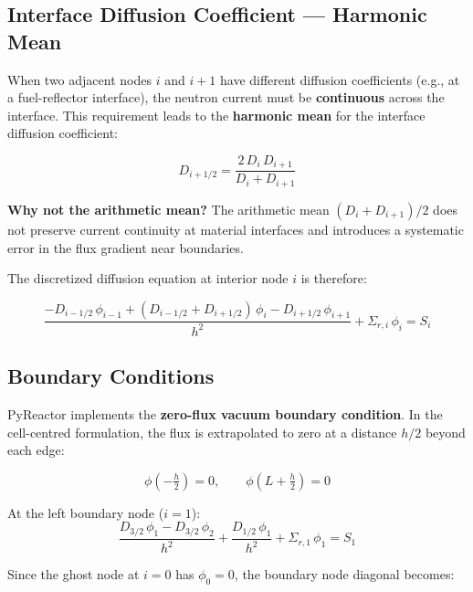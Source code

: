 \documentclass[12pt,a4paper]{article}
\begin{document}
\subsection{Interface Diffusion Coefficient — Harmonic Mean}

When two adjacent nodes $i$ and $i+1$ have different diffusion
coefficients (e.g., at a fuel-reflector interface), the neutron current
must be \textbf{continuous} across the interface. This requirement leads to
the \textbf{harmonic mean} for the interface diffusion coefficient:

\begin{eqbox}
\begin{equation}
  D_{i+1/2} = \frac{2\,D_i\,D_{i+1}}{D_i + D_{i+1}}
  \label{eq:harmonic}
\end{equation}
\end{eqbox}

\textbf{Why not the arithmetic mean?} The arithmetic mean
$(D_i + D_{i+1})/2$ does not preserve current continuity at
material interfaces and introduces a systematic error in the flux
gradient near boundaries.

The discretized diffusion equation at interior node $i$ is therefore:

\begin{equation}
  \frac{-D_{i-1/2}\,\phi_{i-1} + (D_{i-1/2} + D_{i+1/2})\,\phi_i
        - D_{i+1/2}\,\phi_{i+1}}{h^2}
  + \Sigma_{r,i}\,\phi_i = S_i
  \label{eq:fd_interior}
\end{equation}

\subsection{Boundary Conditions}

PyReactor implements the \textbf{zero-flux vacuum boundary condition}.
In the cell-centred formulation, the flux is extrapolated to zero
at a distance $h/2$ beyond each edge:

\begin{equation}
  \phi\!\left(-\tfrac{h}{2}\right) = 0, \qquad
  \phi\!\left(L + \tfrac{h}{2}\right) = 0
  \label{eq:bc}
\end{equation}

At the left boundary node ($i = 1$):
\begin{equation}
  \frac{D_{3/2}\,\phi_1 - D_{3/2}\,\phi_2}{h^2}
  + \frac{D_{1/2}\,\phi_1}{h^2}
  + \Sigma_{r,1}\,\phi_1 = S_1
\end{equation}

Since the ghost node at $i=0$ has $\phi_0 = 0$, the boundary
node diagonal becomes:
\end{document}
